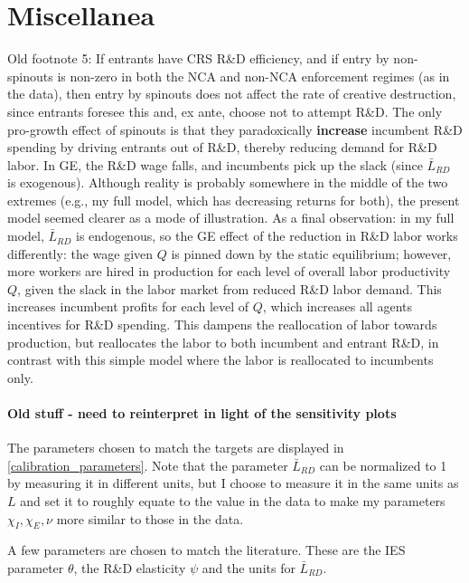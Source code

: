 \documentclass[11pt,english]{article}
\theoremstyle{remark}
\begin{document}


\appendix

\section{Miscellanea}

Old footnote 5: If entrants have CRS R\&D efficiency, and if entry by non-spinouts is non-zero in both the NCA and non-NCA enforcement regimes (as in the data), then entry by spinouts does not affect the rate of creative destruction, since entrants foresee this and, ex ante, choose not to attempt R\&D. The only pro-growth effect of spinouts is that they paradoxically \textbf{increase} incumbent R\&D spending by driving entrants out of R\&D, thereby reducing demand for R\&D labor. In GE, the R\&D wage falls, and incumbents pick up the slack (since $\bar{L}_{RD}$ is exogenous). Although reality is probably somewhere in the middle of the two extremes (e.g., my full model, which has decreasing returns for both), the present model seemed clearer as a mode of illustration. As a final observation: in my full model, $\bar{L}_{RD}$ is endogenous, so the GE effect of the reduction in R\&D labor works differently: the wage given $Q$ is pinned down by the static equilibrium; however, more workers are hired in production for each level of overall labor productivity $Q$, given the slack in the labor market from reduced R\&D labor demand. This increases incumbent profits for each level of $Q$, which increases all agents incentives for R\&D spending. This dampens the reallocation of labor towards production, but reallocates the labor to both incumbent and entrant R\&D, in contrast with this simple model where the labor is reallocated to incumbents only.



\paragraph{Old stuff - need to reinterpret in light of the sensitivity plots}

The parameters chosen to match the targets are displayed in \autoref{calibration_parameters}. Note that the parameter $\bar{L}_{RD}$ can be normalized to 1 by measuring it in different units, but I choose to measure it in the same units as $L$ and set it to roughly equate to the value in the data to make my parameters $\chi_I,\chi_E,\nu$ more similar to those in the data. 

A few parameters are chosen to match the literature. These are the IES parameter $\theta$, the R\&D elasticity $\psi$ and the units for $\bar{L}_{RD}$. 
\end{document}
